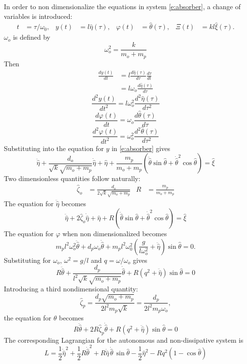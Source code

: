 In order to non dimensionalize the equations in system \eqref{e:absorber}, a change of variables is introduced:
\begin{align*}
t &= \tau/\omega_0, & y(t) &= l \hat \eta(\tau), & \varphi(t) &= \hat \theta(\tau), & \Xi(t) &= k l \hat \xi(\tau).
\end{align*}
$\omega_o$ is defined by
\[
\omega_o^2 = \frac{k}{m_o + m_p}
\]
Then
\begin{align*}
\frac{dy(t)}{dt} &= l \frac{d \hat \eta(\tau)}{d \tau} \frac{d \tau}{d t}\\
&= l \omega_o \frac{d \hat \eta(\tau)}{d \tau}
\end{align*}
\[
\frac{d^2y(t)}{dt^2} = l \omega_o^2 \frac{d^2 \hat \eta(\tau)}{d \tau^2}
\]
\[
\frac{d \varphi(t)}{dt} = \omega_o \frac{d \hat \theta(\tau)}{d \tau}
\]
\[
\frac{d^2 \varphi(t)}{dt^2} = \omega_o^2 \frac{d^2 \hat \theta(\tau)}{d \tau^2}
\]
Substituting into the equation for $y$ in \eqref{e:absorber} gives
\[
\ddot{\hat \eta} + \frac{d_o}{\sqrt{k}\sqrt{m_o + m_p}} \dot{\hat \eta} + \hat \eta + \frac{m_p}{m_o + m_p} (\ddot{\hat \theta} \sin \hat \theta + {\dot{\hat \theta}}^2 \cos \hat \theta) = \hat \xi
\]
Two dimensionless quantities follow naturally:
\begin{align*}
\hat \zeta_o &= \frac{d_o}{2 \sqrt{k} \sqrt{m_o + m_p}} & R &= \frac{m_p}{m_o + m_p}
\end{align*}
The equation for $\ddot{\hat \eta}$ becomes
\[
\ddot{\hat \eta} + 2 \hat \zeta_o \dot{\hat \eta} + \hat \eta + R(\ddot{\hat \theta} \sin \hat \theta + {\dot{\hat \theta}}^2 \cos \hat \theta) = \hat \xi
\]
The equation for $\varphi$ when non dimensionalized becomes
\[
m_p l^2 \omega_o^2 \ddot{\hat \theta} + d_p \omega_o \dot{\hat \theta} + m_p l^2 \omega_0^2 (\frac{g}{l \omega_o^2} + \ddot{\hat \eta}) \sin \hat \theta = 0.
\]
Substituting for $\omega_o$, $\omega^2 = g/l$ and $q = \omega/\omega_o$ gives
\[
R \ddot{\hat \theta} + \frac{d_p}{l^2 \sqrt{k} \sqrt{m_o + m_p}} \dot{\hat \theta} + R (q^2 + \ddot{\hat \eta}) \sin \hat \theta = 0
\]
Introducing a third nondimensional quantity:
\[
\hat \zeta_p = \frac{d_p \sqrt{m_o + m_p}}{2 l^2 m_p \sqrt{k}} = \frac{d_p}{2 l^2 m_p \omega_o},
\]
the equation for $\hat \theta$ becomes
\[
R \ddot{\hat \theta} + 2 R \hat \zeta_p \dot{\hat \theta} + R (q^2 + \ddot{\hat \eta}) \sin \hat \theta = 0
\]
The corresponding Lagrangian for the autonomous and non-dissipative system is
\begin{equation}
\label{E:lagrangian}
L = \frac12 {\dot{\hat\eta}}^2 + \frac12 R {\dot{\hat\theta}}^2 + R {\dot{\hat\eta}}\,{\dot{\hat\theta}}\,\sin \hat{\theta} - \frac12 {\hat \eta}^2 - R q^2 \left(1 - \cos \hat{\theta} \right)
\end{equation}
